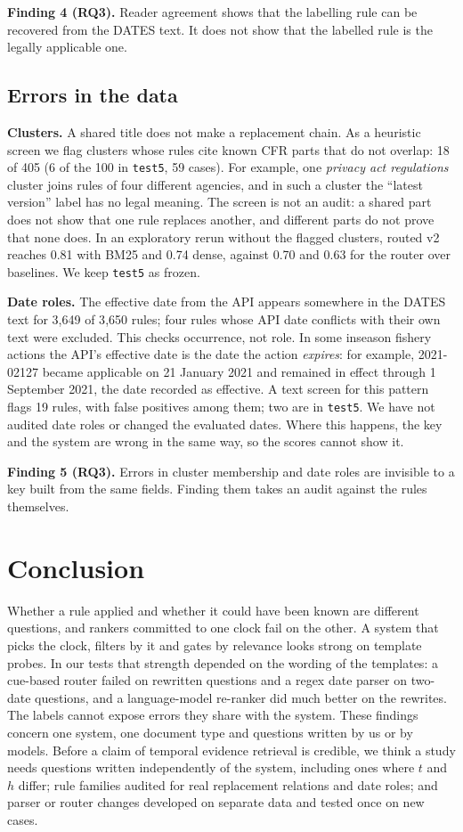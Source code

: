 \documentclass[11pt]{article}
\begin{document}
\textbf{Finding 4 (RQ3).} Reader agreement shows that the labelling rule can be recovered from the DATES text. It does not show that the labelled rule is the legally applicable one.

\subsection{Errors in the data}\label{sec:databreak}

\textbf{Clusters.} A shared title does not make a replacement chain. As a heuristic screen we flag clusters whose rules cite known CFR parts that do not overlap: 18 of 405 (6 of the 100 in \texttt{test5}, 59 cases). For example, one \emph{privacy act regulations} cluster joins rules of four different agencies, and in such a cluster the ``latest version'' label has no legal meaning. The screen is not an audit: a shared part does not show that one rule replaces another, and different parts do not prove that none does. In an exploratory rerun without the flagged clusters, routed v2 reaches 0.81 with BM25 and 0.74 dense, against 0.70 and 0.63 for the router over baselines. We keep \texttt{test5} as frozen.

\textbf{Date roles.} The effective date from the API appears somewhere in the DATES text for 3{,}649 of 3{,}650 rules; four rules whose API date conflicts with their own text were excluded. This checks occurrence, not role. In some inseason fishery actions the API's effective date is the date the action \emph{expires}: for example, 2021-02127 became applicable on 21 January 2021 and remained in effect through 1 September 2021, the date recorded as effective. A text screen for this pattern flags 19 rules, with false positives among them; two are in \texttt{test5}. We have not audited date roles or changed the evaluated dates. Where this happens, the key and the system are wrong in the same way, so the scores cannot show it.

\textbf{Finding 5 (RQ3).} Errors in cluster membership and date roles are invisible to a key built from the same fields. Finding them takes an audit against the rules themselves.

\section{Conclusion}
Whether a rule applied and whether it could have been known are different questions, and rankers committed to one clock fail on the other. A system that picks the clock, filters by it and gates by relevance looks strong on template probes. In our tests that strength depended on the wording of the templates: a cue-based router failed on rewritten questions and a regex date parser on two-date questions, and a language-model re-ranker did much better on the rewrites. The labels cannot expose errors they share with the system. These findings concern one system, one document type and questions written by us or by models. Before a claim of temporal evidence retrieval is credible, we think a study needs questions written independently of the system, including ones where $t$ and $h$ differ; rule families audited for real replacement relations and date roles; and parser or router changes developed on separate data and tested once on new cases.
\end{document}
